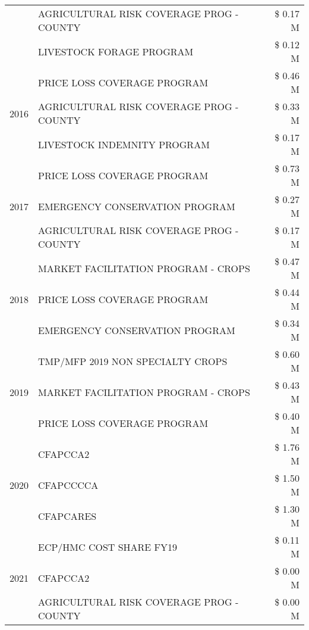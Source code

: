\begin{tabular}{llr}
 & AGRICULTURAL RISK COVERAGE PROG - COUNTY & \$ 0.17 M \\
 & LIVESTOCK FORAGE PROGRAM & \$ 0.12 M \\
\cline{1-3}
\multirow[t]{3}{*}{2016} & PRICE LOSS COVERAGE PROGRAM                   & \$ 0.46 M \\
 & AGRICULTURAL RISK COVERAGE PROG - COUNTY      & \$ 0.33 M \\
 & LIVESTOCK INDEMNITY PROGRAM                   & \$ 0.17 M \\
\cline{1-3}
\multirow[t]{3}{*}{2017} & PRICE LOSS COVERAGE PROGRAM & \$ 0.73 M \\
 & EMERGENCY CONSERVATION PROGRAM & \$ 0.27 M \\
 & AGRICULTURAL RISK COVERAGE PROG - COUNTY & \$ 0.17 M \\
\cline{1-3}
\multirow[t]{3}{*}{2018} & MARKET FACILITATION PROGRAM - CROPS & \$ 0.47 M \\
 & PRICE LOSS COVERAGE PROGRAM & \$ 0.44 M \\
 & EMERGENCY CONSERVATION PROGRAM & \$ 0.34 M \\
\cline{1-3}
\multirow[t]{3}{*}{2019} & TMP/MFP 2019 NON SPECIALTY CROPS & \$ 0.60 M \\
 & MARKET FACILITATION PROGRAM - CROPS & \$ 0.43 M \\
 & PRICE LOSS COVERAGE PROGRAM & \$ 0.40 M \\
\cline{1-3}
\multirow[t]{3}{*}{2020} & CFAPCCA2 & \$ 1.76 M \\
 & CFAPCCCCA & \$ 1.50 M \\
 & CFAPCARES & \$ 1.30 M \\
\cline{1-3}
\multirow[t]{3}{*}{2021} & ECP/HMC COST SHARE FY19 & \$ 0.11 M \\
 & CFAPCCA2 & \$ 0.00 M \\
 & AGRICULTURAL RISK COVERAGE PROG - COUNTY & \$ 0.00 M \\
\cline{1-3}
\bottomrule
\end{tabular}
